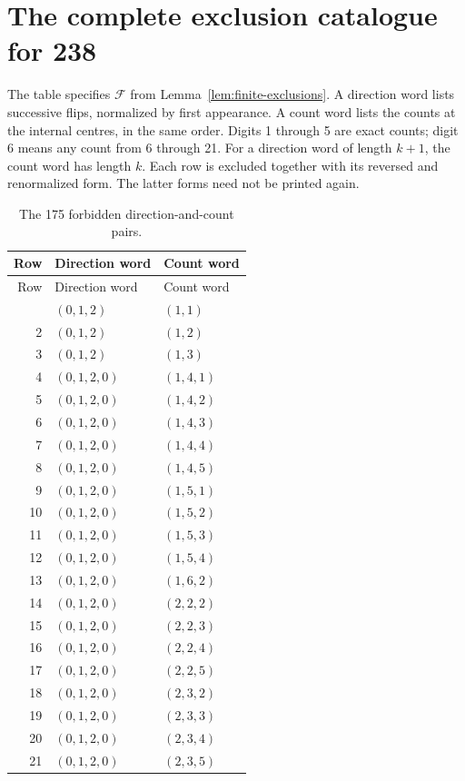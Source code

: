 \documentclass[11pt,a4paper]{article}
\theoremstyle{definition}
\theoremstyle{remark}
\begin{document}
\section{The complete exclusion catalogue for 238}\label{app:exclusion-catalogue}
The table specifies $\mathcal F$ from Lemma~\ref{lem:finite-exclusions}. A direction word lists successive flips, normalized by first appearance. A count word lists the counts at the internal centres, in the same order. Digits 1 through 5 are exact counts; digit 6 means any count from 6 through 21. For a direction word of length $k+1$, the count word has length $k$. Each row is excluded together with its reversed and renormalized form. The latter forms need not be printed again.

\begin{longtable}{rll}
\caption{The 175 forbidden direction-and-count pairs.}\label{tab:exclusion-catalogue}\\
\toprule
Row & Direction word & Count word\\
\midrule
\endfirsthead
\toprule
Row & Direction word & Count word\\
\midrule
\endhead
\bottomrule
\endfoot
1 & $(0,1,2)$ & $(1,1)$\\
2 & $(0,1,2)$ & $(1,2)$\\
3 & $(0,1,2)$ & $(1,3)$\\
4 & $(0,1,2,0)$ & $(1,4,1)$\\
5 & $(0,1,2,0)$ & $(1,4,2)$\\
6 & $(0,1,2,0)$ & $(1,4,3)$\\
7 & $(0,1,2,0)$ & $(1,4,4)$\\
8 & $(0,1,2,0)$ & $(1,4,5)$\\
9 & $(0,1,2,0)$ & $(1,5,1)$\\
10 & $(0,1,2,0)$ & $(1,5,2)$\\
11 & $(0,1,2,0)$ & $(1,5,3)$\\
12 & $(0,1,2,0)$ & $(1,5,4)$\\
13 & $(0,1,2,0)$ & $(1,6,2)$\\
14 & $(0,1,2,0)$ & $(2,2,2)$\\
15 & $(0,1,2,0)$ & $(2,2,3)$\\
16 & $(0,1,2,0)$ & $(2,2,4)$\\
17 & $(0,1,2,0)$ & $(2,2,5)$\\
18 & $(0,1,2,0)$ & $(2,3,2)$\\
19 & $(0,1,2,0)$ & $(2,3,3)$\\
20 & $(0,1,2,0)$ & $(2,3,4)$\\
21 & $(0,1,2,0)$ & $(2,3,5)$\\

\end{longtable}
\end{document}
